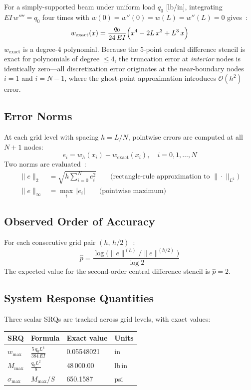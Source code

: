 \documentclass[12pt, letterpaper]{article}
\newcommand{\EI}{EI}
\newcommand{\wex}{w_{\mathrm{exact}}}
\newcommand{\wh}{w_h}
\newcommand{\phat}{\hat{p}}
\begin{document}
For a simply-supported beam under uniform load $q_0$ [lb/in], integrating
$EI\,w'''' = q_0$ four times with $w(0)=w''(0)=w(L)=w''(L)=0$
gives~\cite{gere2018}:
\begin{equation}
  \wex(x) = \frac{q_0}{24\,\EI}\Bigl(x^4 - 2L\,x^3 + L^3\,x\Bigr)
  \label{eq:exact}
\end{equation}
$\wex$ is a degree-4 polynomial.
Because the 5-point central difference stencil is exact for polynomials of
degree $\leq 4$, the truncation error at \emph{interior} nodes is identically
zero---all discretization error originates at the near-boundary nodes
$i=1$ and $i=N-1$, where the ghost-point approximation introduces
$\mathcal{O}(h^2)$ error.

\subsection{Error Norms}

At each grid level with spacing $h=L/N$, pointwise errors are computed at all
$N+1$ nodes:
\[
  e_i = \wh(x_i) - \wex(x_i), \quad i=0,1,\ldots,N
\]
Two norms are evaluated~\cite{oberkampf2010}:
\begin{align}
  \|e\|_2 &= \sqrt{h\sum_{i=0}^{N} e_i^2}
  \qquad\text{(rectangle-rule approximation to $\|\cdot\|_{L^2}$)} \\
  \|e\|_\infty &= \max_{i}\,|e_i|
  \qquad\text{(pointwise maximum)}
\end{align}

\subsection{Observed Order of Accuracy}

For each consecutive grid pair $(h,\,h/2)$~\cite{roache1998}:
\begin{equation}
  \phat = \frac{\log\!\bigl(\|e\|^{(h)}/\|e\|^{(h/2)}\bigr)}{\log 2}
  \label{eq:phat}
\end{equation}
The expected value for the second-order central difference stencil is
$\phat = 2$.

\subsection{System Response Quantities}

Three scalar SRQs are tracked across grid levels, with exact values:
\begin{center}
\begin{tabular}{llll}
\toprule
\textbf{SRQ} & \textbf{Formula} & \textbf{Exact value} & \textbf{Units}\\
\midrule
$w_{\max}$ & $\displaystyle\frac{5\,q_0 L^4}{384\,\EI}$ & 0.05548021 & in \\[6pt]
$M_{\max}$ & $\displaystyle\frac{q_0 L^2}{8}$ & 48\,000.00 & lb\,in \\[6pt]
$\sigma_{\max}$ & $M_{\max}/S$ & 650.1587 & psi \\
\bottomrule
\end{tabular}
\end{center}
\end{document}
